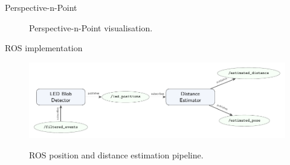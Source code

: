 \documentclass{beamer}
\begin{document}

\begin{frame}{Perspective-n-Point}

\begin{figure}[H]
    \centering
    \hspace{1em}%
    \label{fig:pnp}
    \caption{Perspective-n-Point visualisation.}
\end{figure}

\end{frame}


\begin{frame}{ROS implementation}

    \begin{figure}
        \centering
        \includegraphics[width=1.0\textwidth]{../fig/tikz/rosflow.pdf}
        \label{fig:ros}
        \caption{ROS position and distance estimation pipeline.}
    \end{figure}

\end{frame}
\end{document}
